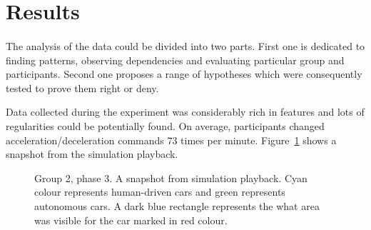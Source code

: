 \documentclass[11pt,english,twoside]{article}
\begin{document}
\section{Results}

\paragraph{}

The analysis of the data could be divided into two parts. First one is dedicated to finding patterns, observing dependencies and evaluating particular group and participants. Second one proposes a range of hypotheses which were consequently tested to prove them right or deny. %

\par

Data collected during the experiment was considerably rich in features and lots of regularities could be potentially found. On average, participants changed acceleration/deceleration commands 73 times per minute. 
Figure~\ref{fig:sample_snapshot} shows a snapshot from the simulation playback.  
 
 
\begin{figure}[!] %
\caption{Group 2, phase 3. A snapshot from simulation playback. Cyan colour represents human-driven cars and green represents autonomous cars. A dark blue rectangle represents the what area was visible for the car marked in red colour.}
\label{fig:sample_snapshot}
\end{figure} 
 
\end{document}
